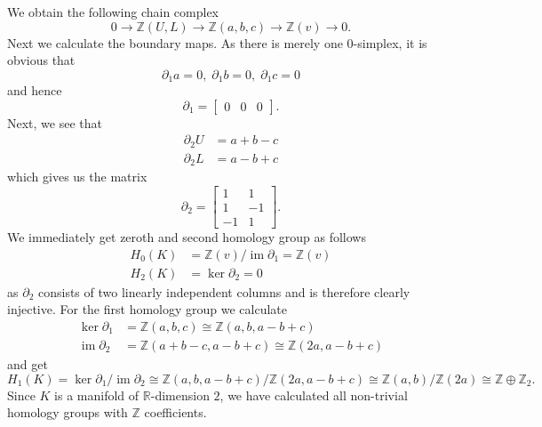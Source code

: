 \documentclass[a4paper, 12pt]{article}
\DeclareMathOperator{\im}{im}
\newcommand{\Z}{\mathbb{Z}}
\newcommand{\R}{\mathbb{R}}
\newcommand{\iso}{\cong}
\begin{document}
\begin{enumerate}
	We obtain the following chain complex
	\[
	0 \to \Z(U, L) \to \Z(a, b, c) \to \Z(v) \to 0.
	\]
	Next we calculate the boundary maps. As there is merely one $0$-simplex, it is obvious that
	\[
	\partial_1 a = 0,\;
	\partial_1 b = 0,\;
	\partial_1 c = 0
	\]
	and hence
	\[
	\partial_1 =
	\begin{bmatrix}
	0 & 0 & 0
	\end{bmatrix}.
	\]
	Next, we see that
	\begin{align*}
	\partial_2 U &= a + b - c \\
	\partial_2 L &= a - b + c
	\end{align*}
	which gives us the matrix
	\[
	\partial_2 =
	\begin{bmatrix}
	1 & 1 \\
	1 & -1 \\
	-1 & 1
	\end{bmatrix}.
	\]
	We immediately get zeroth and second homology group as follows
	\begin{align*}
	H_0(K) &= \Z(v)/\im\partial_1 = \Z(v) \\
	H_2(K) &= \ker\partial_2 = 0
	\end{align*}
	as $\partial_2$ consists of two linearly independent columns and is therefore clearly injective.
	For the first homology group we calculate
	\begin{align*}
	\ker\partial_1 &= \Z(a, b, c) \iso \Z(a, b, a - b + c) \\
	\im\partial_2 &= \Z(a + b - c, a - b + c) \iso \Z(2a, a - b + c)
	\end{align*}
	and get
	\[
	H_1(K) = \ker\partial_1/\im\partial_2 \iso \Z(a, b, a - b + c) / \Z(2a, a - b + c) \iso \Z(a, b) / \Z(2a) \iso \Z \oplus \Z_2.
	\]
	Since $K$ is a manifold of $\R$-dimension $2$, we have calculated all non-trivial homology groups with $\Z$ coefficients.
	

\end{enumerate}
\end{document}
